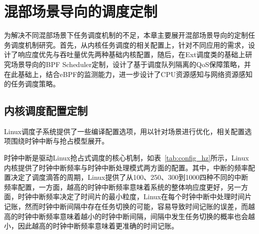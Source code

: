 \chapter{混部场景导向的调度定制}\label{chap:sched_policy}




为解决不同混部场景下任务调度机制的不足，本章主要展开混部场景导向的定制任务调度机制研究。首先，从内核任务调度的相关配置上，针对不同应用的需求，设计了响应度优先与吞吐量优先两种基础内核配置，随后，在Ext调度类的基础上研究场景导向的BPF Scheduler定制，设计了基于调度队列隔离的QoS保障策略，并在此基础上，结合eBPF的监测能力，进一步设计了CPU资源感知与网络资源感知的任务调度策略。

\section{内核调度配置定制}

Linux调度子系统提供了一些编译配置选项，用以针对场景进行优化，相关配置选项围绕时钟中断与抢占模型展开。

时钟中断是驱动Linux抢占式调度的核心机制，如表~\ref{tab:config_hz}所示，Linux内核提供了时钟中断频率与时钟中断处理模式两方面的配置。其中，中断的频率配置决定了调度滴答的周期，Linux提供了从100、250、300到1000四种不同的中断频率配置，一方面，越高的时钟中断频率意味着系统的整体响应度更好，另一方面，时钟中断频率决定了时间片的最小粒度，Linux在每个时钟中断中处理时间片记账，然而时钟中断间隔中存在任务切换的可能，容易导致时间记账的误差，而越高的时钟中断频率意味着越小的时钟中断间隔，间隔中发生任务切换的概率也会越小，因此越高的时钟中断频率意味着更准确的时间记账。

